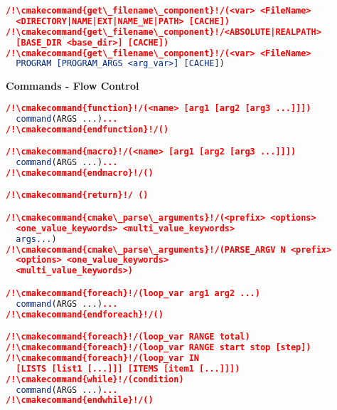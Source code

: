 \documentclass{article}
\newcommand{\cmakecommand}[1]{{\href{https://cmake.org/cmake/help/v3.20/command/#1.html}{#1}}}
\begin{document}
\begin{minipage}[t]{0.18\linewidth}
\begin{lstlisting}[language=CMake]
/!\cmakecommand{get\_filename\_component}!/(<var> <FileName>
  <DIRECTORY|NAME|EXT|NAME_WE|PATH> [CACHE])
/!\cmakecommand{get\_filename\_component}!/<ABSOLUTE|REALPATH>
  [BASE_DIR <base_dir>] [CACHE])
/!\cmakecommand{get\_filename\_component}!/(<var> <FileName>
  PROGRAM [PROGRAM_ARGS <arg_var>] [CACHE])
\end{lstlisting}

\textbf{Commands - Flow Control}
\begin{lstlisting}[language=CMake]
/!\cmakecommand{function}!/(<name> [arg1 [arg2 [arg3 ...]]])
  command(ARGS ...)...
/!\cmakecommand{endfunction}!/()

/!\cmakecommand{macro}!/(<name> [arg1 [arg2 [arg3 ...]]])
  command(ARGS ...)...
/!\cmakecommand{endmacro}!/()

/!\cmakecommand{return}!/ ()

/!\cmakecommand{cmake\_parse\_arguments}!/(<prefix> <options>
  <one_value_keywords> <multi_value_keywords>
  args...)
/!\cmakecommand{cmake\_parse\_arguments}!/(PARSE_ARGV N <prefix>
  <options> <one_value_keywords>
  <multi_value_keywords>)

/!\cmakecommand{foreach}!/(loop_var arg1 arg2 ...)
  command(ARGS ...)...
/!\cmakecommand{endforeach}!/()

/!\cmakecommand{foreach}!/(loop_var RANGE total)
/!\cmakecommand{foreach}!/(loop_var RANGE start stop [step])
/!\cmakecommand{foreach}!/(loop_var IN
  [LISTS [list1 [...]]] [ITEMS [item1 [...]]])
/!\cmakecommand{while}!/(condition)
  command(ARGS ...)...
/!\cmakecommand{endwhile}!/()
\end{lstlisting}
\end{minipage}
\hfill\vline\hfill
\end{document}
